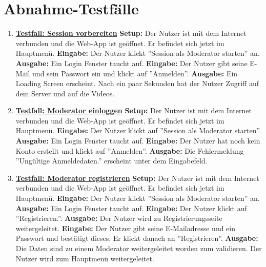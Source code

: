 \section{Abnahme-Testfälle}
\begin{enumerate}
	\item \underline{\textbf{Testfall: Session vorbereiten}} \linebreak
	\textbf{Setup:} Der Nutzer ist mit dem Internet verbunden und die Web-App ist geöffnet. Er befindet sich jetzt im Hauptmenü.\linebreak
	\textbf{Eingabe:} Der Nutzer klickt ''Session als Moderator starten'' an.\linebreak
	\textbf{Ausgabe:} Ein Login Fenster taucht auf.\linebreak
	\textbf{Eingabe:} Der Nutzer gibt seine E-Mail und sein Passwort ein und klickt auf ''Anmelden''.\linebreak
	\textbf{Ausgabe:} Ein Loading Screen erscheint. Nach ein paar Sekunden hat der Nutzer Zugriff auf dem Server und auf die Videos.
	
	\item \underline{\textbf{Testfall: Moderator einloggen}} \linebreak
	\textbf{Setup:} Der Nutzer ist mit dem Internet verbunden und die Web-App ist geöffnet. Er befindet sich jetzt im Hauptmenü. \linebreak
	\textbf{Eingabe:} Der Nutzer klickt auf ''Session als Moderator starten''. \linebreak
	\textbf{Ausgabe:} Ein Login Fenster taucht auf.\linebreak
	\textbf{Eingabe:} Der Nutzer hat noch kein Konto erstellt und klickt auf ''Anmelden''.\linebreak
	\textbf{Ausgabe:} Die Fehlermeldung ''Ungültige Anmeldedaten.'' erscheint unter dem Eingabefeld.
	
	\item \underline{\textbf{Testfall: Moderator registrieren}} \linebreak
	\textbf{Setup:} Der Nutzer ist mit dem Internet verbunden und die Web-App ist geöffnet. Er befindet sich jetzt im Hauptmenü.\linebreak
	\textbf{Eingabe:} Der Nutzer klickt ''Session als Moderator starten'' an. \linebreak
	\textbf{Ausgabe:} Ein Login Fenster taucht auf.\linebreak
	\textbf{Eingabe:} Der Nutzer klickt auf ''Registrieren.''.\linebreak
	\textbf{Ausgabe:} Der Nutzer wird zu Registrierungsseite weitergeleitet.\linebreak
	\textbf{Eingabe:} Der Nutzer gibt seine E-Mailadresse und ein Passwort und bestätigt dieses. Er klickt danach an ''Registrieren''. \linebreak
	\textbf{Ausgabe:} Die Daten sind zu einem Moderator weitergeleitet worden zum validieren.  Der Nutzer wird zum Hauptmenü weitergeleitet.
	

\end{enumerate}
